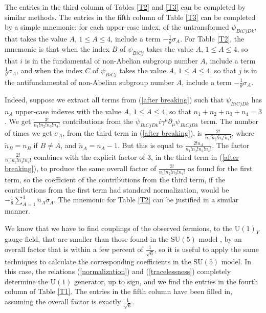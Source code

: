 \documentclass[a4paper,12pt,oneside]{article}
\begin{document}
The entries in the third column of Tables \ref{T2} and \ref{T3} can
be completed by similar methods.  The entries in the fifth column 
of Table \ref{T3} 
can be completed by a simple mnemonic: for each upper-case index, of
the untransformed $\psi_{BiCjDk}$, that takes the value $A$, 
$1\leq A\leq 4$, include a term $-\frac{1}{\theta}\sigma_A$.  For
Table \ref{T2}, the mnemonic is that when the index $B$ of 
$\psi_{BiCj}$ takes the value $A$, $1\leq A\leq 4$, so that $i$ is 
in the fundamental of non-Abelian subgroup number $A$, include a
term $\frac{1}{\theta}\sigma_A$, and when the index $C$ of 
$\psi_{BiCj}$ takes the value $A$, $1\leq A\leq 4$, so that $j$ is 
in the antifundamental of non-Abelian subgroup number $A$, include 
a term $-\frac{1}{\theta}\sigma_A$.

Indeed, suppose we extract all terms from
(\ref{after breaking}) such that $\psi_{BiCjDk}$ has $n_A$ 
upper-case indexes with the value $A$, $1\leq A\leq 4$, so that
$n_1+n_2+n_3+n_4=3$.  We get $\frac{3!}{n_1!n_2!n_3!n_4!}$ 
contributions from the 
$\bar{\psi}_{BiCjDk}i\gamma^\mu\partial_\mu\psi_{BiCjDk}$ term.  The
number of times we get $\sigma_A$, from the third term in
(\ref{after breaking}), is 
$\frac{2!}{\tilde{n}_1!\tilde{n}_2!\tilde{n}_3!\tilde{n}_4!}$, where
$\tilde{n}_B=n_B$ if $B\neq A$, and $\tilde{n}_A=n_A-1$.  But this 
is equal to $\frac{2!n_A}{n_1!n_2!n_3!n_4!}$.  The factor
$\frac{2!}{n_1!n_2!n_3!n_4!}$ combines with the explicit factor of
3, in the third term in (\ref{after breaking}), to produce the same
overall factor of $\frac{3!}{n_1!n_2!n_3!n_4!}$ as found for the
first term, so the coefficient of the contributions from the third
term, if the contributions from the first term had standard
normalization, would be $-\frac{1}{\theta}\displaystyle\sum_{A=1}^4
n_A\sigma_A$.  The mnemonic for Table \ref{T2} can be justified in a
similar manner.

We know that we have to find couplings of the observed fermions, to
the $\mathrm{U}(1)_Y$ gauge field, that are smaller than those found
in the $\mathrm{SU}(5)$ model \cite{GG, Mohapatra}, by an overall
factor that is within a few percent of $\frac{1}{\sqrt{6}}$, so it 
is useful to apply the same techniques to calculate the 
corresponding coefficients in the $\mathrm{SU}(5)$ model.  In this
case, the relations (\ref{normalization}) and (\ref{tracelessness})
completely determine the $\mathrm{U}(1)$ generator, up to sign, and
we find the entries in the fourth column of Table \ref{T1}.  The
entries in the fifth column have been filled in, assuming the 
overall factor is exactly $\frac{1}{\sqrt{6}}$.
\end{document}
